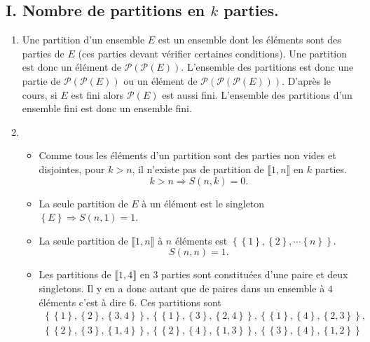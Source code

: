 \subsection*{I. Nombre de partitions en $k$ parties.}
\begin{enumerate}
 \item Une partition d'un ensemble $E$ est un ensemble dont les éléments sont des parties de $E$ (ces parties devant vérifier certaines conditions). Une partition est donc un élément de $\mathcal{P}(\mathcal{P}(E))$. L'ensemble des partitions est donc une partie de $\mathcal{P}(\mathcal{P}(E))$ ou un élément de $\mathcal{P}(\mathcal{P}(\mathcal{P}(E)))$.\newline
 D'après le cours, si $E$ est fini alors $\mathcal{P}(E)$ est aussi fini. L'ensemble des partitions d'un ensemble fini est donc un ensemble fini.
 
 \item
 \begin{itemize}
  \item Comme tous les éléments d'un partition sont des parties non vides et disjointes, pour $k>n$, il n'existe pas de partition de $\llbracket 1,n \rrbracket$ en $k$ parties.
  \[
   k > n \Rightarrow S(n,k) = 0. 
  \]
  \item La seule partition de $E$ à un élément est le singleton $\left\lbrace E \right\rbrace \Rightarrow S(n,1)=1$.
  \item La seule partition de $\llbracket 1,n \rrbracket$ à $n$ éléments est $\left\lbrace \left\lbrace 1 \right\rbrace, \left\lbrace 2 \right\rbrace, \cdots \left\lbrace n \right\rbrace \right\rbrace $.
  \[
   S(n,n) = 1.
  \]
  \item Les partitions de $\llbracket 1,4 \rrbracket$ en $3$ parties sont constituées d'une paire et deux singletons. Il y en a donc autant que de paires dans un ensemble à $4$ éléments c'est à dire $6$. Ces partitions sont
  \begin{multline*}
     \left\lbrace \left\lbrace 1\right\rbrace, \left\lbrace 2\right\rbrace, \left\lbrace 3,4\right\rbrace \right\rbrace,
     \left\lbrace \left\lbrace 1\right\rbrace, \left\lbrace 3\right\rbrace, \left\lbrace 2,4\right\rbrace \right\rbrace,
     \left\lbrace \left\lbrace 1\right\rbrace, \left\lbrace 4\right\rbrace, \left\lbrace 2,3\right\rbrace \right\rbrace,\\
     \left\lbrace \left\lbrace 2\right\rbrace, \left\lbrace 3\right\rbrace, \left\lbrace 1,4\right\rbrace \right\rbrace,
     \left\lbrace \left\lbrace 2\right\rbrace, \left\lbrace 4\right\rbrace, \left\lbrace 1,3\right\rbrace \right\rbrace,
     \left\lbrace \left\lbrace 3\right\rbrace, \left\lbrace 4\right\rbrace, \left\lbrace 1,2\right\rbrace \right\rbrace
  \end{multline*}
 \end{itemize}


\end{enumerate}
